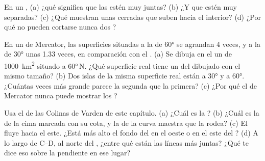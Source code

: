 \begin{exercise}[$\star$]\label{exo:g9:maps-of-the-earth:4}
En un , (a) ¿qué significa que las  estén
muy juntas? (b) ¿Y que estén muy separadas? (c) ¿Qué muestran unas  cerradas que suben hacia el interior? (d) ¿Por qué no pueden
cortarse nunca dos ?
\end{exercise}

\begin{exercise}[$\star\star$]\label{exo:g9:maps-of-the-earth:5}
En un  de Mercator, las superficies situadas a la  de \ang{60}
se agrandan 4 veces, y a la  de \ang{30} unas 1.33 veces, en
comparación con el . (a) Se dibuja en el  un  de
\qty{1000}{km^2} situado a \ang{60}\,N. ¿Qué superficie real tiene un 
del  dibujado con el mismo tamaño? (b) Dos islas de la misma
superficie real están a \ang{30} y a \ang{60}. ¿Cuántas veces más grande
parece la segunda que la primera? (c) ¿Por qué el  de Mercator nunca
puede mostrar los ?
\end{exercise}

\begin{exercise}[$\star\star$]\label{exo:g9:maps-of-the-earth:6}
Usa el  de las Colinas de Varden de este capítulo. (a) ¿Cuál
es la ? (b) ¿Cuál es la  de la cima marcada con su
cota, y la de la curva maestra que la rodea? (c) El  fluye hacia el
este. ¿Está más alto el fondo del  en el oeste o en el este del ?
(d) A lo largo de C--D, al norte del , ¿entre qué  están
las líneas más juntas? ¿Qué te dice eso sobre la pendiente en ese lugar?
\end{exercise}

